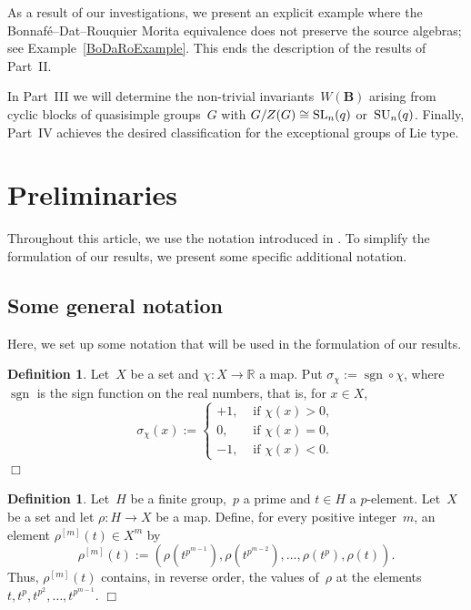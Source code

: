 \documentclass[12pt]{amsart}
\newcommand{\bB}{{\mathbf{B}}}
\def\SL{ \text{\rm SL} }
\def\SU{ \text{\rm SU} }
\DeclareMathOperator{\sgn}{sgn}
\theoremstyle{theorem}
\theoremstyle{definition}
\newtheorem{defn}[thm]{Definition}
\theoremstyle{remark}
\begin{document}
As a result of our investigations, we present an explicit example where the 
Bonnaf{\'e}--Dat--Rouquier Morita equivalence \cite[Theorem~$1.1$]{BoDaRo} does 
not preserve the source algebras; see Example~\ref{BoDaRoExample}. This ends 
the description of the results of Part~II.

In Part~III we will determine the non-trivial invariants~$W( \bB )$ arising from 
cyclic blocks of quasisimple groups~$G$ with $G/Z(G) \cong \SL_n(q)$ 
or~$\SU_n(q)$. Finally, Part~IV achieves the desired classification for the
exceptional groups of Lie type.

\section{Preliminaries}

Throughout this article, we use the notation introduced in 
\cite[Section~$2$]{HL24}. To simplify the formulation of our results, we
present some specific additional notation.

\subsection{Some general notation} Here, we set up some notation that will be 
used in the formulation of our results.

\begin{defn}
\label{SignFunction}
{\rm
Let~$X$ be a set and $\chi: X \rightarrow \mathbb{R}$ a map.
Put $\sigma_{\chi} := \sgn \circ \chi$, where $\sgn$ is the sign 
function on the real numbers, that is, for $x \in X$,
$$\sigma_\chi( x ) := \begin{cases} +1, & \text{\ if\ } \chi( x ) > 0, \\
                                     0, & \text{\ if\ } \chi( x ) = 0, \\
                                    -1, & \text{\ if\ } \chi( x ) < 0.
                           \end{cases}$$
}\hfill $\Box$
\end{defn}

\begin{defn}
\label{PowersOfT}
{
Let~$H$ be a finite group,~$p$ a prime and $t \in H$ a $p$-element. Let~$X$ be a 
set and let $\rho: H \rightarrow X$ be a map. Define, for every positive 
integer~$m$, an element $\rho^{[m]}( t ) \in X^m$ by
$$\rho^{[m]}( t ) := (\rho( t^{p^{m-1}} ), \rho( t^{p^{m-2}} ), \ldots,
\rho( t^p ), \rho( t ) ).$$
Thus, $\rho^{[m]}( t )$ contains, in reverse order, the values of~$\rho$
at the elements $t, t^p, t^{p^2}, \ldots, t^{p^{m-1}}$.
}\hfill $\Box$
\end{defn}
\end{document}

